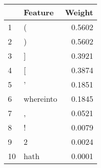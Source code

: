 \begin{tabular}{llr}
\toprule
{} &    Feature &  Weight \\
\midrule
1  &          ( &  0.5602 \\
2  &          ) &  0.5602 \\
3  &          ] &  0.3921 \\
4  &          [ &  0.3874 \\
5  &          ' &  0.1851 \\
6  &  whereinto &  0.1845 \\
7  &          , &  0.0521 \\
8  &          ! &  0.0079 \\
9  &          2 &  0.0024 \\
10 &       hath &  0.0001 \\
\bottomrule
\end{tabular}
